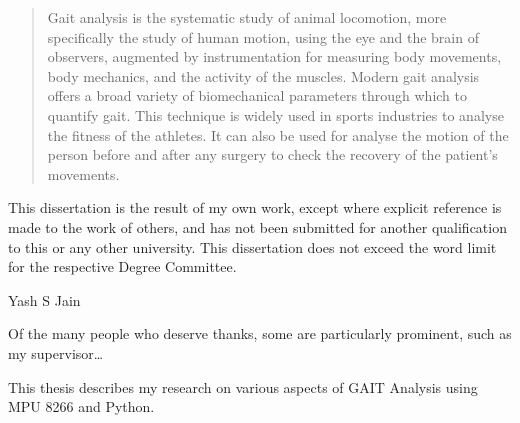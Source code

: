 
\begin{abstract}%
  Gait analysis is the systematic study of animal locomotion, more
specifically the study of human motion, using the eye and the brain of
observers, augmented by instrumentation for measuring body
movements, body mechanics, and the activity of the muscles. Modern gait analysis offers a broad variety of
biomechanical parameters through which to quantify gait. This technique
is widely used in sports industries to analyse the fitness of the athletes. It
can also be used for analyse the motion of the person before and after
any surgery to check the recovery of the patient’s movements.
\end{abstract}


\begin{declaration}
  This dissertation is the result of my own work, except where explicit
  reference is made to the work of others, and has not been submitted
  for another qualification to this or any other university. This
  dissertation does not exceed the word limit for the respective Degree
  Committee.
  \vspace*{1cm}
  \begin{flushright}
        Yash S Jain
  \end{flushright}
\end{declaration}


\begin{acknowledgements}
  Of the many people who deserve thanks, some are particularly prominent,
  such as my supervisor\dots
\end{acknowledgements}


\begin{preface}
  This thesis describes my research on various aspects of GAIT Analysis using MPU 8266 and Python.
\end{preface}

\tableofcontents



